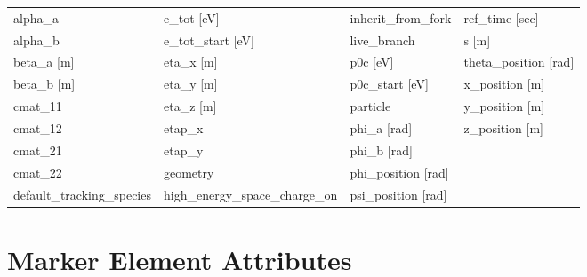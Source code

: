  \begin{tabular}{llll} \toprule
alpha_a                          & e_tot [eV]                       & inherit_from_fork                & ref_time [sec]                   \\
alpha_b                          & e_tot_start [eV]                 & live_branch                      & s [m]                            \\
beta_a [m]                       & eta_x [m]                        & p0c [eV]                         & theta_position [rad]             \\
beta_b [m]                       & eta_y [m]                        & p0c_start [eV]                   & x_position [m]                   \\
cmat_11                          & eta_z [m]                        & particle                         & y_position [m]                   \\
cmat_12                          & etap_x                           & phi_a [rad]                      & z_position [m]                   \\
cmat_21                          & etap_y                           & phi_b [rad]                      &                                  \\
cmat_22                          & geometry                         & phi_position [rad]               &                                  \\
default_tracking_species         & high_energy_space_charge_on      & psi_position [rad]               &                                  \\
 \bottomrule
 \end{tabular}
 \vfill
 
 \section{Marker Element Attributes}
 \label{s:list.marker}
 
